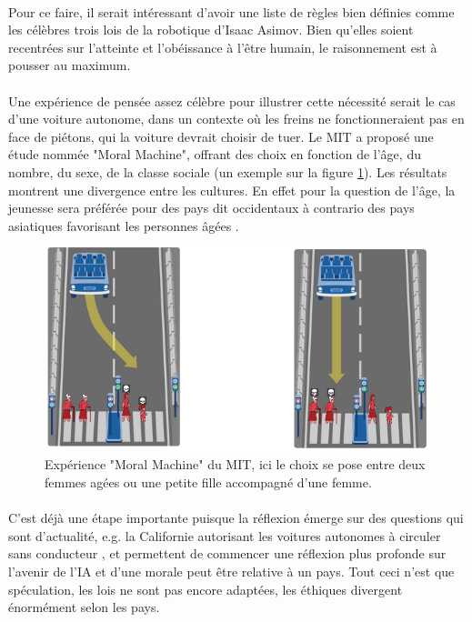 \documentclass[10pt, french, a4paper]{report}
\begin{document}
\paragraph{}
Pour ce faire, il serait intéressant d’avoir une liste de règles bien définies comme les célèbres trois lois de la robotique d’Isaac Asimov. Bien qu'elles soient recentrées sur l’atteinte et l’obéissance à l’être humain, le raisonnement est à pousser au maximum.

\paragraph{}
Une expérience de pensée assez célèbre pour illustrer cette nécessité serait le cas d'une voiture autonome, dans un contexte où les freins ne fonctionneraient pas en face de piétons, qui la voiture devrait choisir de tuer. Le MIT a proposé une étude nommée "Moral Machine", offrant des choix en fonction de l’âge, du nombre, du sexe, de la classe sociale (un exemple sur la figure \ref{fig:moral_machine}). Les résultats montrent une divergence entre les cultures. En effet pour la question de l’âge, la jeunesse sera préférée pour des pays dit occidentaux à contrario des pays asiatiques favorisant les personnes âgées \citep{awad_moral_2018}.

\begin{figure}[hbt!]
    \centering
    \includegraphics[width=\textwidth]{images/moral_machine.png}
    \caption{Expérience "Moral Machine" du MIT, ici le choix se pose entre deux femmes agées ou une petite fille accompagné d'une femme.}
    \label{fig:moral_machine}
\end{figure}

\paragraph{}
C’est déjà une étape importante puisque la réflexion émerge sur des questions qui sont d’actualité, e.g. la Californie autorisant les voitures autonomes à circuler sans conducteur \citep{shepardson_waymo_2018}, et permettent de commencer une réflexion plus profonde sur l’avenir de l’IA et d’une morale peut être relative à un pays. Tout ceci n’est que spéculation, les lois ne sont pas encore adaptées, les éthiques divergent énormément selon les pays.
\end{document}

